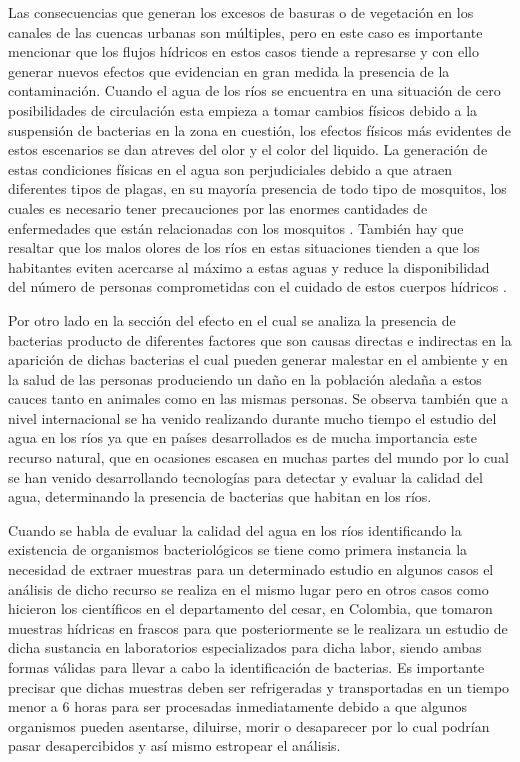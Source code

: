Las consecuencias que generan los excesos de basuras o de vegetación en los canales de las cuencas urbanas son múltiples, pero en este caso es importante mencionar que los flujos hídricos en estos casos tiende a represarse y con ello generar nuevos efectos que evidencian en gran medida la presencia de la contaminación. Cuando el agua de los ríos se encuentra en una situación de cero posibilidades de circulación esta empieza a tomar cambios físicos debido a la suspensión de bacterias en la zona en cuestión, los efectos físicos más evidentes de estos escenarios se dan atreves del olor y el color del liquido. La generación de estas condiciones físicas en el agua son perjudiciales debido a que atraen diferentes tipos de plagas, en su mayoría presencia de todo tipo de mosquitos, los cuales es necesario tener precauciones por las enormes cantidades de enfermedades que están relacionadas con los mosquitos \cite{SecretariadeSalud2020}. También hay que resaltar que los malos olores de los ríos en estas situaciones tienden a que los habitantes eviten acercarse al máximo a estas aguas y reduce la disponibilidad del número de personas comprometidas con el cuidado de estos cuerpos hídricos \cite{Yu2021}.



Por otro lado en la sección del efecto en el cual se analiza la presencia de bacterias producto de diferentes factores que son causas directas e indirectas en la aparición de dichas bacterias el cual pueden generar malestar en el ambiente y en la salud de las personas produciendo un daño en la población aledaña a estos cauces tanto en animales como en las mismas personas. Se observa también que a nivel internacional se ha venido realizando durante mucho tiempo el estudio del agua en los ríos ya que en países desarrollados es de mucha importancia este recurso natural, que en ocasiones escasea en muchas partes del mundo por lo cual se han venido desarrollando tecnologías para detectar y evaluar la calidad del agua, determinando la presencia de bacterias que habitan en los ríos.

Cuando se habla de evaluar la calidad del agua en los ríos identificando la existencia de organismos bacteriológicos se tiene como primera instancia la necesidad de extraer muestras para un determinado estudio en algunos casos el análisis de dicho recurso se realiza en el mismo lugar pero en otros casos como hicieron los científicos en el departamento del cesar, en Colombia, que tomaron muestras hídricas en frascos para que posteriormente se le realizara un estudio de dicha sustancia en laboratorios especializados para dicha labor, siendo ambas formas válidas para llevar a cabo la identificación de bacterias. Es importante precisar que dichas muestras deben ser refrigeradas y transportadas en un tiempo menor a 6 horas para ser procesadas inmediatamente debido a que algunos organismos pueden asentarse, diluirse, morir o desaparecer por lo cual podrían pasar desapercibidos y así mismo estropear el análisis.

